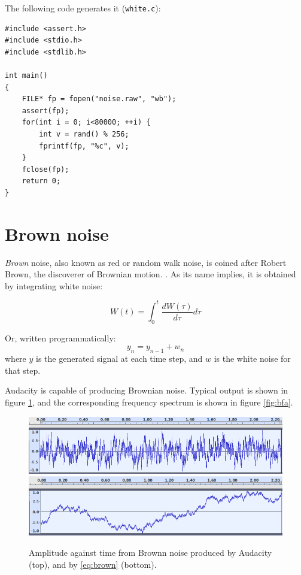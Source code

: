 \documentclass[a4paper,10pt]{article}
\def\code#1{\texttt{#1}}
\begin{document}
The following code generates it (\code{white.c}):
\begin{Verbatim}[tabsize=8]
#include <assert.h>
#include <stdio.h>
#include <stdlib.h>

int main()
{
	FILE* fp = fopen("noise.raw", "wb");
	assert(fp);
	for(int i = 0; i<80000; ++i) {
		int v = rand() % 256;
		fprintf(fp, "%c", v);
	}
	fclose(fp);
	return 0;
}
\end{Verbatim}
%

%
 
\section{Brown noise}

\emph{Brown} noise, also known as red or random walk noise, is coined after Robert Brown, the discoverer of Brownian 
motion. \cite{brown}. 
As its name implies, it is obtained by integrating white noise:

\begin{equation}
 W(t) = \int_{0}^{t} \frac{dW(\tau)}{d\tau} d\tau
\end{equation}

Or, written programmatically:
\begin{equation} 
	\label{eq:brown}
	y_{n} = y_{n-1} + w_n
\end{equation}
where $y$ is the generated signal at each time step, and $w$ is the white noise for that step.

Audacity \cite{audacity} is capable of producing Brownian noise. Typical output is shown in figure \ref{fig:baa}, and the corresponding frequency spectrum is shown in figure \ref{fig:bfa}.


\begin{figure}[!]
       \centering
       \includegraphics[width=12cm]{brown-amp-audacity.png}
       \includegraphics[width=12cm]{brown-amp.png}
	\caption{Amplitude against time from Brownn noise produced by Audacity (top), and by \ref{eq:brown} (bottom).}
       \label{fig:baa}
\end{figure}
\end{document}
